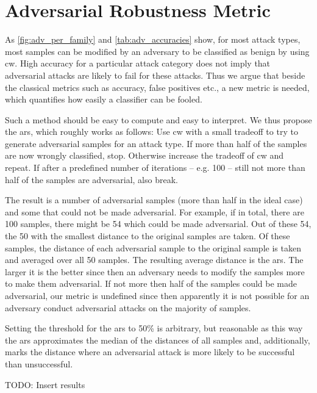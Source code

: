 \documentclass[conference]{IEEEtran}
\newcommand\note[2]{{\color{#1}#2}}
\newcommand\todo[1]{{\note{red}{TODO: #1}}}
\begin{document}
\section{Adversarial Robustness Metric}

As \autoref{fig:adv_per_family} and \autoref{tab:adv_accuracies} show, for most attack types, most samples can be modified by an adversary to be classified as benign by using \gls{cw}. High accuracy for a particular attack category does not imply that adversarial attacks are  likely to fail for these attacks. Thus we argue that beside the classical metrics such as accuracy, false positives etc., a new metric is needed, which quantifies how easily a classifier can be fooled. 

Such a method should be easy to compute and easy to interpret. We thus propose the \gls{ars}, which roughly works as follows: Use \gls{cw} with a small tradeoff to try to generate adversarial samples for an attack type. If more than half of the samples are now wrongly classified, stop. Otherwise increase the tradeoff of \gls{cw} and repeat. If after a predefined number of iterations -- e.g. 100 -- still not more than half of the samples are adversarial, also break. 

The result is a number of adversarial samples (more than half in the ideal case) and some that could not be made adversarial. For example, if in total, there are 100 samples, there might be 54 which could be made adversarial. Out of these 54, the 50 with the smallest distance to the original samples are taken. Of these samples, the distance of each adversarial sample to the original sample is taken and averaged over all 50 samples. The resulting average distance is the \gls{ars}. The larger it is the better since then an adversary needs to modify the samples more to make them adversarial. If not more then half of the samples could be made adversarial, our metric is undefined since then apparently it is not possible for an adversary conduct adversarial attacks on the majority of samples.

Setting the threshold for the \gls{ars} to 50\% is arbitrary, but
 reasonable as this way the \gls{ars} approximates the median of the distances of all samples and, additionally, marks the distance where an adversarial attack is more likely to be successful than unsuccessful.

\todo{Insert results}
\end{document}
